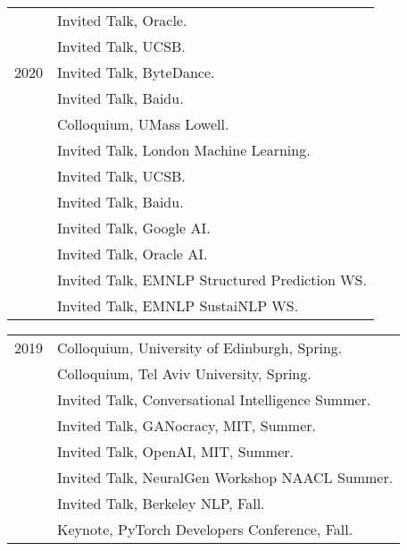 \documentclass[10pt]{article}
\begin{document}
{{{{\begin{tabular}{lp{11.5cm}}
	 & \ind   Invited Talk, Oracle.                         \\
	 & \ind   Invited Talk, UCSB.                           \\
	2020
	 & \ind   Invited Talk, ByteDance.                      \\
	 & \ind   Invited Talk, Baidu.                          \\
	 & \ind   Colloquium, UMass Lowell.                     \\
	 & \ind   Invited Talk, London Machine Learning.        \\
	 & \ind   Invited Talk, UCSB.                           \\
	 & \ind   Invited Talk, Baidu.                          \\
	 & \ind   Invited Talk, Google AI.                      \\
	 & \ind   Invited Talk, Oracle AI.                      \\
	 & \ind   Invited Talk, EMNLP Structured Prediction WS. \\
	 & \ind   Invited Talk, EMNLP SustaiNLP WS.             \\
\end{tabular}

\hspace{-1cm} \begin{tabular}{lp{11.5cm}}
	2019
	 & \ind   Colloquium, University of Edinburgh, Spring.      \\
	 & \ind   Colloquium, Tel Aviv University, Spring.          \\
	 & \ind   Invited Talk, Conversational Intelligence Summer. \\
	 & \ind   Invited Talk, GANocracy, MIT, Summer.             \\
	 & \ind   Invited Talk, OpenAI, MIT, Summer.                \\
	 & \ind   Invited Talk, NeuralGen Workshop NAACL Summer.    \\
	 & \ind   Invited Talk, Berkeley NLP, Fall.                 \\
	 & \ind   Keynote, PyTorch Developers Conference, Fall.     \\
\end{tabular}

}}}}
\end{document}
